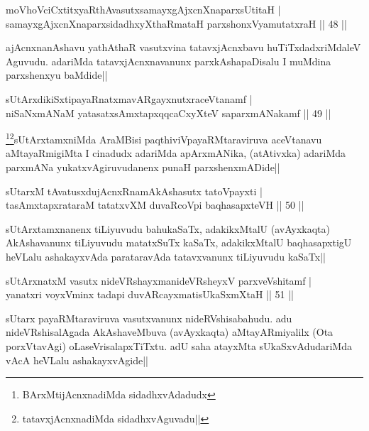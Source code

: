 \begin{shl}
moVhoVciCxtitxyaRthAvasutxsamayxgAjxcnXnaparxsUtitaH |\\
samayxgAjxcnXnaparxsidadhxyXthaRmataH parxshonxV\s yamutatxraH \hfill || 48 ||
\end{shl}

\begin{artha}
ajAcnxnanAshavu yathAthaR vasutxvina tatavxjAcnxbavu huTiTxdadxriMdaleV Aguvudu. adariMda tatavxjAcnxnavanunx parxkAshapaDisalu I muMdina parxshenxyu baMdide||
\end{artha}

\begin{shl}
sUtArxdikiSxtipayaRnatxmavARgayxnutxraceVtanamf |\\
niSaNxmANaM yatasatxsAmxtapxqqcaCxyXteV saparxmANakamf \hfill || 49 ||
\end{shl}

\begin{artha}
\footnote[1]{BArxMtijAcnxnadiMda sidadhxvAdadudx}\footnote[2]{tatavxjAcnxnadiMda sidadhxvAguvadu||}sUtArxtamxniMda AraMBisi paqthiviVpayaRMtaraviruva aceVtanavu aMtayaRmigiMta I cinadudx adariMda apArxmANika, (atAtivxka) adariMda parxmANa yukatxvAgiruvudanenx punaH parxshenxmADide||
\end{artha}


\begin{shl}
sUtarxM tAvatusxdujAcnxRnamAkAshasutx tatoV\s payxti |\\
tasAmxtapxrataraM tatatxvXM duvaRcoV\s pi baqhasapxteVH \hfill || 50 ||
\end{shl}

\begin{artha}
sUtArxtamxnanenx tiLiyuvudu bahukaSaTx, adakikxMtalU (avAyxkaqta) AkAshavanunx tiLiyuvudu matatxSuTx kaSaTx, adakikxMtalU baqhasapxtigU heVLalu ashakayxvAda parataravAda tatavxvanunx tiLiyuvudu kaSaTx||
\end{artha}


\begin{shl}
sUtArxnatxM vasutx nideVRshayxmanideVRsheyxV parxveVshitamf |\\
yanatxri voyxVminx tadapi duvARcayxmatisUkaSxmXtaH \hfill || 51 ||
\end{shl}

\begin{artha}
sUtarx payaRMtaraviruva vasutxvanunx nideRVshisabahudu. adu nideVRshisalAgada AkAshaveMbuva (avAyxkaqta) aMtayARmiyalilx (Ota porxVtavAgi) oLaseVrisalapxTiTxtu. adU saha atayxMta sUkaSxvAdudariMda vAcA heVLalu ashakayxvAgide||
\end{artha}

